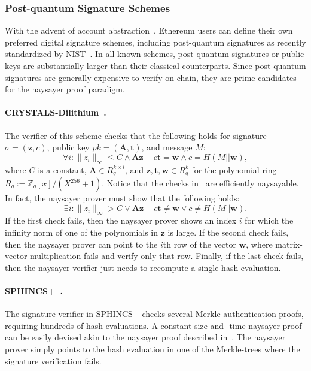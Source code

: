 \subsubsection{Post-quantum Signature Schemes}
With the advent of account abstraction~\cite{accountabstraction}, Ethereum users can define their own preferred digital signature schemes, including post-quantum signatures as recently standardized by NIST~\cite{CCS:BHKNRS19,TCHES:DKLLS18,NISTPQC:FALCON22}.
In all known schemes, %
post-quantum signatures or public keys are substantially larger than their classical counterparts.  Since post-quantum signatures are generally expensive to verify on-chain, they are prime candidates for the naysayer proof paradigm.

\paragraph{CRYSTALS-Dilithium~\cite{TCHES:DKLLS18}.} The verifier of this scheme checks that the following holds for signature $\sigma=(\mathbf{z},c)$, public key $\mathit{pk}=(\mathbf{A},\mathbf{t})$, and message $M$:
\begin{equation}\label{eq:crystals_verifier_check}
    \forall i: \lVert z_i\rVert_{\infty}\leq C\land \mathbf{A}\mathbf{z}-c\mathbf{t} = \mathbf{w} \land c=H(M\vert\vert \mathbf{w}),
\end{equation}
where $C$ is a constant, $\mathbf{A}\in R^{k\times l}_q$, and $\mathbf{z},\mathbf{t},\mathbf{w}\in R^{k}_q$ for the polynomial ring $R_q:=\mathbb{Z}_q[x]/(X^{256}+1)$. Notice that the checks in~ are efficiently naysayable. In fact, the naysayer prover must show that the following holds: 
\begin{equation}\label{eq:crystals_naysayer_prover}
    \exists i: \lVert z_i\rVert_{\infty}>C\lor \mathbf{A}\mathbf{z}-c\mathbf{t} \neq \mathbf{w} \lor c\neq H(M\vert\vert \mathbf{w}).
\end{equation}
If the first check fails, then the naysayer prover shows an index $i$ for which the infinity norm of one of the polynomials in $\mathbf{z}$ is large. If the second check fails, then the naysayer prover can point to the $i$th row of the vector $\mathbf{w}$, where matrix-vector multiplication fails and verify only that row. Finally, if the last check fails, then the naysayer verifier just needs to recompute a single hash evaluation.

\paragraph{SPHINCS+~\cite{CCS:BHKNRS19}.} The signature verifier in SPHINCS+ checks several Merkle authentication proofs, requiring hundreds of hash evaluations. A constant-size and -time naysayer proof can be easily devised akin to the naysayer proof described in~. The naysayer prover simply points to the hash evaluation in one of the Merkle-trees where the signature verification fails. 

